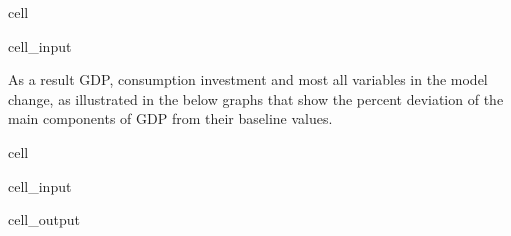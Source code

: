 \documentclass[letterpaper,10pt,english]{jupyterBook}
\begin{document}
\begin{sphinxuseclass}{cell}\begin{sphinxVerbatimInput}

\begin{sphinxuseclass}{cell_input}
\begin{sphinxVerbatim}[commandchars=\\\{\}]
    
   
\end{sphinxVerbatim}

\end{sphinxuseclass}\end{sphinxVerbatimInput}

\end{sphinxuseclass}
\sphinxAtStartPar
As a result GDP, consumption investment and most all variables in the model change, as illustrated in the below graphs that show the percent deviation of the main components of GDP from their baseline values.

\begin{sphinxuseclass}{cell}\begin{sphinxVerbatimInput}

\begin{sphinxuseclass}{cell_input}
\begin{sphinxVerbatim}[commandchars=\\\{\}]
\PYG{p}{[}\PYG{p}{]}
\end{sphinxVerbatim}

\end{sphinxuseclass}\end{sphinxVerbatimInput}
\begin{sphinxVerbatimOutput}

\begin{sphinxuseclass}{cell_output}
\noindent{}

\end{sphinxuseclass}\end{sphinxVerbatimOutput}

\end{sphinxuseclass}
\end{document}
